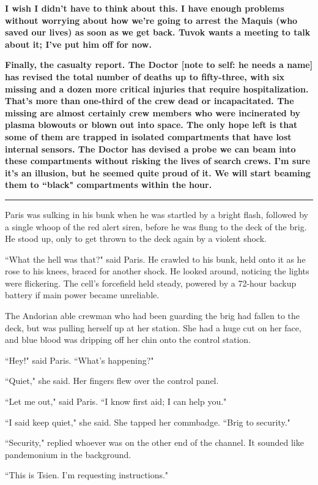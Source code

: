 \documentclass[twoside,letterpaper,12pt]{memoir}
\begin{document}
\textbf{I wish I didn't have to think about this. I have enough problems without worrying about how we're going to arrest the Maquis (who saved our lives) as soon as we get back. Tuvok wants a meeting to talk about it; I've put him off for now.}

\textbf{Finally, the casualty report. The Doctor [note to self: he needs a name] has revised the total number of deaths up to fifty-three, with six missing and a dozen more critical injuries that require hospitalization. That's more than one-third of the crew dead or incapacitated. The missing are almost certainly crew members who were incinerated by plasma blowouts or blown out into space. The only hope left is that some of them are trapped in isolated compartments that have lost internal sensors. The Doctor has devised a probe we can beam into these compartments without risking the lives of search crews. I'm sure it's an illusion, but he seemed quite proud of it. We will start beaming them to ``black" compartments within the hour.}

\fancybreak{\rule{3cm}{0.4 pt}}
Paris was sulking in his bunk when he was startled by a bright flash, followed by a single whoop of the red alert siren, before he was flung to the deck of the brig. He stood up, only to get thrown to the deck again by a violent shock.

``What the hell was that?" said Paris. He crawled to his bunk, held onto it as he rose to his knees, braced for another shock. He looked around, noticing the lights were flickering. The cell's forcefield held steady, powered by a 72-hour backup battery if main power became unreliable.

The Andorian able crewman who had been guarding the brig had fallen to the deck, but was pulling herself up at her station. She had a huge cut on her face, and blue blood was dripping off her chin onto the control station.

``Hey!" said Paris. ``What's happening?"

``Quiet," she said. Her fingers flew over the control panel.

``Let me out," said Paris. ``I know first aid; I can help you."

``I said keep quiet," she said. She tapped her commbadge. ``Brig to security."

``Security," replied whoever was on the other end of the channel. It sounded like pandemonium in the background.

``This is Tsien. I'm requesting instructions."
\end{document}
